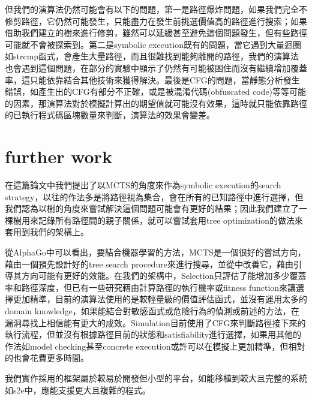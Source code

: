 \documentclass[12pt,a4paper,oneside]{book}
\begin{document}
但我們的演算法仍然可能會有以下的問題，第一是路徑爆炸問題，如果我們完全不修剪路徑，它仍然可能發生，只能盡力在發生前挑選價值高的路徑進行搜索；如果借助我們建立的樹來進行修剪，雖然可以延緩甚至避免這個問題發生，但有些路徑可能就不會被探索到。第二是symbolic execution既有的問題，當它遇到大量迴圈如strcmp函式，會產生大量路徑，而且很難找到能夠離開的路徑，我們的演算法也會遇到這個問題，在部分的實驗中顯示了仍然有可能被困住而沒有繼續增加覆蓋率，這只能依靠結合其他技術來獲得解決。最後是CFG的問題，當靜態分析發生錯誤，如產生出的CFG有部分不正確，或是被混淆代碼(obfuscated code)等等可能的因素，那演算法對於模擬計算出的期望值就可能沒有效果，這時就只能依靠路徑的已執行程式碼區塊數量來判斷，演算法的效果會變差。

\section{further work}

在這篇論文中我們提出了以MCTS的角度來作為symbolic execution的search strategy，以往的作法多是將路徑視為集合，會在所有的已知路徑中進行選擇，但我們認為以樹的角度來嘗試解決這個問題可能會有更好的結果；因此我們建立了一棵樹用來記錄所有路徑間的親子關係，就可以嘗試套用tree optimization的做法來套用到我們的架構上。

從AlphaGo中可以看出，要結合機器學習的方法，MCTS是一個很好的嘗試方向，藉由一個預先設計好的tree search procedure來進行搜尋，並從中改善它，藉由引導其方向可能有更好的效能。在我們的架構中，Selection只評估了能增加多少覆蓋率和路徑深度，但已有一些研究藉由計算路徑的執行機率或fitness function來讓選擇更加精準，目前的演算法使用的是較輕量級的價值評估函式，並沒有運用太多的domain knowledge，如果能結合對敏感函式或危險行為的偵測或前述的方法，在漏洞尋找上相信能有更大的成效。Simulation目前使用了CFG來判斷路徑接下來的執行流程，但並沒有根據路徑目前的狀態和satisfiability進行選擇，如果用其他的作法如model checking甚至concrete execution或許可以在模擬上更加精準，但相對的也會花費更多時間。

我們實作採用的框架屬於較易於開發但小型的平台，如能移植到較大且完整的系統如s2e中，應能支援更大且複雜的程式。

\newpage

\printbibliography[title={References}]

\newpage
\end{document}
